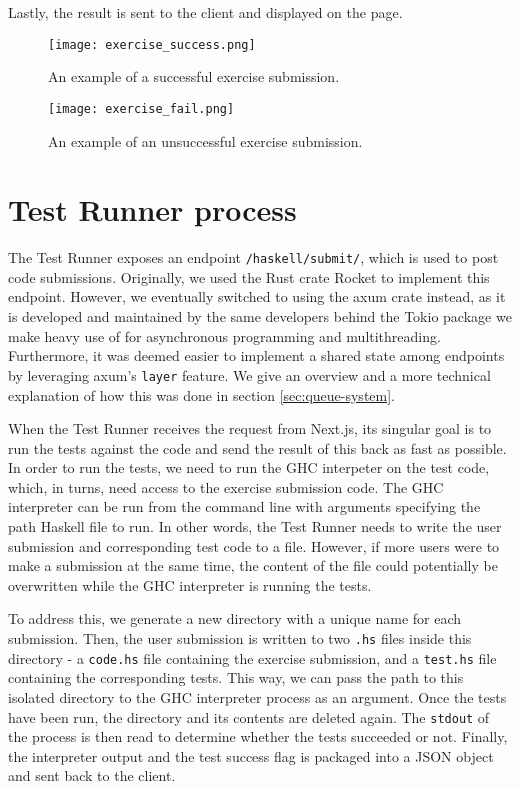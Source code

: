 Lastly, the result is sent to the client and displayed on the page.

\begin{figure}[H]
	\texttt{[image: exercise\_success.png]}
	\centering
	\caption{An example of a successful exercise submission.}
	\label{fig:exercise_success}
\end{figure}

\begin{figure}[H]
	\texttt{[image: exercise\_fail.png]}
	\centering
	\caption{An example of an unsuccessful exercise submission.}
	\label{fig:exercise_fail}
\end{figure}


\section{Test Runner process} \label{sec:test_runner_process}
The Test Runner exposes an endpoint \texttt{/haskell/submit/}, which is used to post code submissions.
Originally, we used the Rust crate Rocket to implement this endpoint.
However, we eventually switched to using the axum crate instead, as it is developed and maintained by the same developers behind the Tokio package we make heavy use of for asynchronous programming and multithreading.
Furthermore, it was deemed easier to implement a shared state among endpoints by leveraging axum's \texttt{layer} feature.
We give an overview and a more technical explanation of how this was done in section \ref{sec:queue-system}.

When the Test Runner receives the request from Next.js, its singular goal is to run the tests against the code and send the result of this back as fast as possible.
In order to run the tests, we need to run the GHC interpeter on the test code, which, in turns, need access to the exercise submission code.
The GHC interpreter can be run from the command line with arguments specifying the path Haskell file to run.
In other words, the Test Runner needs to write the user submission and corresponding test code to a file.
However, if more users were to make a submission at the same time, the content of the file could potentially be overwritten while the GHC interpreter is running the tests.

To address this, we generate a new directory with a unique name for each submission.
Then, the user submission is written to two  \texttt{.hs} files inside this directory - a \texttt{code.hs} file containing the exercise submission, and a \texttt{test.hs} file containing the corresponding tests.
This way, we can pass the path to this isolated directory to the GHC interpreter process as an argument.
Once the tests have been run, the directory and its contents are deleted again.
The \texttt{stdout} of the process is then read to determine whether the tests succeeded or not.
Finally, the interpreter output and the test success flag is packaged into a JSON object and sent back to the client.

